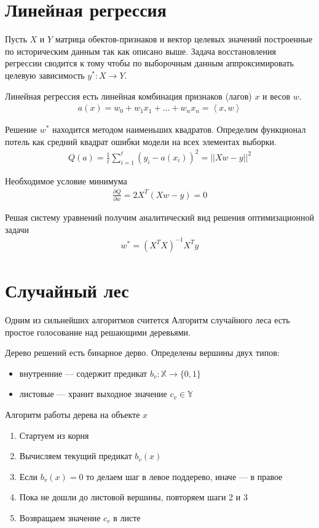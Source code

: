\section{Линейная регрессия}

Пусть $X$ и $Y$ матрица обектов-признаков и вектор целевых значений построенные по историческим данным так как описано выше.
Задача восстановления регрессии сводится к тому чтобы по выборочным данным аппроксимировать целевую зависимость $y^* : X \rightarrow Y$.


Линейная регрессия есть линейная комбинация признаков (лагов) $x$ и весов $w$.
\begin{align}
	a(x) = w_0 + w_1 x_1 + \dots + w_n x_n = \left< x, w \right>
\end{align}

Решение $w^*$ находится методом наименьших квадратов. 
Определим функционал потель как средний квадрат ошибки модели на всех элементах выборки.
\begin{align}
	Q(a) = \frac{1}{\ell} \sum_{i=1}^{\ell} \left( y_i - a(x_i)\right)^2 = ||Xw - y||^2
\end{align}

Необходимое условие минимума
\begin{align}
	\frac{\partial Q}{ \partial w} = 2X^T(Xw - y) = 0
\end{align}

Решая систему уравнений получим аналитический вид решения оптимизационной задачи
\begin{align}
	w^* = \left(X^TX\right)^{-1}X^Ty
\end{align}

\section{Случайный лес}

Одним из сильнейших алгоритмов считется Алгоритм случайного леса есть простое голосование над решающими деревьями.

Дерево решений есть бинарное дерво. Определены вершины двух типов: 
\begin{itemize}
	\item внутренние --- содержит предикат $b_v : \mathbb{X}\rightarrow \{0, 1\}$
	\item листовые --- хранит выходное значение $c_v \in \mathbb{Y}$
\end{itemize}

Алгоритм работы дерева на объекте $x$
\begin{enumerate}
	\item Стартуем из корня
	\item Вычисляем текущий предикат $b_v(x)$
	\item Если $b_v(x) = 0$ то делаем шаг в левое поддерево, иначе --- в правое
	\item Пока не дошли до листовой вершины, повторяем шаги 2 и 3
	\item Возвращаем значение $c_v$ в листе
\end{enumerate}

